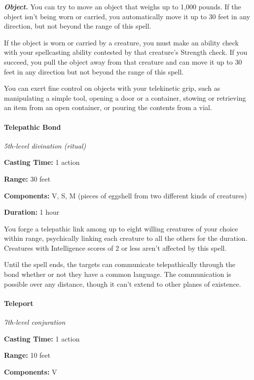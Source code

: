 \documentclass[
]{article}
\begin{document}
\emph{\textbf{Object.}} You can try to move an object that weighs up to
1,000 pounds. If the object isn't being worn or carried, you
automatically move it up to 30 feet in any direction, but not beyond the
range of this spell.

If the object is worn or carried by a creature, you must make an ability
check with your spellcasting ability contested by that creature's
Strength check. If you succeed, you pull the object away from that
creature and can move it up to 30 feet in any direction but not beyond
the range of this spell.

You can exert fine control on objects with your telekinetic grip, such
as manipulating a simple tool, opening a door or a container, stowing or
retrieving an item from an open container, or pouring the contents from
a vial.

\hypertarget{telepathic-bond}{%
\paragraph{Telepathic Bond}\label{telepathic-bond}}

\emph{5th-level divination (ritual)}

\textbf{Casting Time:} 1 action

\textbf{Range:} 30 feet

\textbf{Components:} V, S, M (pieces of eggshell from two different
kinds of creatures)

\textbf{Duration:} 1 hour

You forge a telepathic link among up to eight willing creatures of your
choice within range, psychically linking each creature to all the others
for the duration. Creatures with Intelligence scores of 2 or less aren't
affected by this spell.

Until the spell ends, the targets can communicate telepathically through
the bond whether or not they have a common language. The communication
is possible over any distance, though it can't extend to other planes of
existence.

\hypertarget{teleport}{%
\paragraph{Teleport}\label{teleport}}

\emph{7th-level conjuration}

\textbf{Casting Time:} 1 action

\textbf{Range:} 10 feet

\textbf{Components:} V
\end{document}

